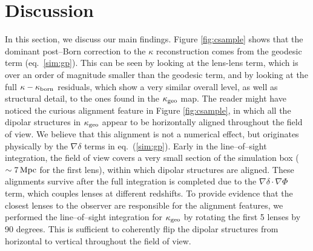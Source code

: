 \documentclass[reprint,aps,prd,superscriptaddress,showkeys,showpacs]{revtex4-1}
\begin{document}
\section{Discussion}
\label{sec:discuss}
% 
In this section, we discuss our main findings. Figure \ref{fig:csample} shows that the dominant post--Born correction to the $\kappa$ reconstruction comes from the geodesic term (eq.~\ref{sim:gp}). This can be seen by looking at the lens-lens term, which is over an order of magnitude smaller than the geodesic term, and by looking at the full $\kappa-\kappa_{\rm born}$ residuals, which show a very similar overall level, as well as structural detail, to the ones found in the $\kappa_{\rm geo}$ map. The reader might have noticed the curious alignment feature in Figure \ref{fig:csample}, in which all the dipolar structures in $\kappa_{\rm geo}$ appear to be horizontally aligned throughout the field of view. We believe that this alignment is not a numerical effect, but originates physically by the $\nabla\delta$ terms in eq.~(\ref{sim:gp}). Early in the line--of--sight integration, the field of view covers a very small section of the simulation box ($\sim7\,{\rm Mpc}$ for the first lens), within which dipolar structures are aligned. These alignments survive after the full integration is completed due to the $\nabla\delta\cdot\nabla\Phi$ term, which couples lenses at different redshifts. To provide evidence that the closest lenses to the observer are responsible for the alignment features, we performed the line--of--sight integration for $\kappa_{\rm geo}$ by rotating the first 5 lenses by 90 degrees. This is sufficient to coherently flip the dipolar structures from horizontal to vertical throughout the field of view.
\end{document}
